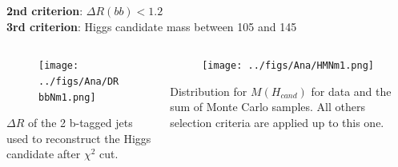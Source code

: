 \begin{frame}{}
\vspace{-.2cm}
    \begin{block}{}\scriptsize
      \textbf{2nd criterion}: $\Delta R(bb)<1.2$\\
      \textbf{3rd criterion}: Higgs candidate mass between 105 and 145 \GeVcc
    \end{block}

\vspace{-.5cm}
\begin{columns}
\begin{column}{.50\textwidth}
\begin{figure}[!Hhtbp]
  \begin{center}
    \texttt{[image: ../figs/Ana/DRbbNm1.png]}
  \end{center}
\end{figure}

\vspace{-.7cm}
    \begin{block}{}\tiny
      $\Delta R$ of the 2 b-tagged jets used to reconstruct the Higgs candidate after $\chi^{2}$ cut.
    \end{block}
\end{column}

\begin{column}{.50\textwidth}
\begin{figure}[!Hhtbp]
  \begin{center}
    \texttt{[image: ../figs/Ana/HMNm1.png]}
  \end{center}
\end{figure}

\vspace{-.7cm}
    \begin{block}{}\tiny
      Distribution for $M(H_{cand})$ for data and the sum of Monte Carlo samples. All others selection criteria are applied up to this one.
    \end{block}
\end{column}

\end{columns}

\end{frame}


